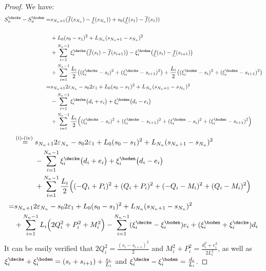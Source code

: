 \begin{thm}
\begin{proof}
We have:
\begin{align*}
S^\decke_n  - S^\boden_n =& s_{{N_n}+1} (\overline f(s_{N_n}) - \underline f(s_{N_n})) + s_0 ( \underline f(s_1) -  \overline f(s_1))\\ \\ 
&+  L_0 (s_0 - s_1)^2  + L_{N_n} (s_{{N_n}+1} - s_{N_n})^2\\
		 &+\sum_{i=1}^{{N_n}-1} \xi^\decke_{i} \bigl( \overline f(s_i) - \overline f(s_{i+1}) \bigr) - \xi^\boden_{i} \bigl( \underline f(s_i) - \underline f(s_{i+1})\bigr) \\
		&+ \sum_{i=1}^{{N_n}-1} \frac{L_i}{2} \bigl( (\xi^\decke_{i}-s_i )^2+ (\xi^\decke_{i} -s_{i+1})^2 \bigr) + \frac{L_i}{2} \bigl( (\xi^\boden_{i}-s_i )^2 + (\xi^\boden_{i} -s_{i+1})^2 \bigr) \\
		\stackrel{\text{ }}{=} 
& s_{{N_n}+1} 2 \varepsilon_{N_n} - s_0 2 \varepsilon_1 +  L_0 (s_0 - s_1)^2  + L_{N_n} (s_{{N_n}+1} - s_{N_n})^2\\
		 &-\sum_{i=1}^{{N_n}-1} \xi^\decke_{i} \bigl( d_i+ e_i \bigr) + \xi^\boden_{i} \bigl(  d_i-e_i \bigr) \\
		&+ \sum_{i=1}^{{N_n}-1} \frac{L_i}{2} \Bigl( (\xi^\decke_{i}-s_i )^2+ (\xi^\decke_{i} -s_{i+1})^2  +  (\xi^\boden_{i}-s_i )^2 + (\xi^\boden_{i} -s_{i+1})^2 \Bigr) \\
\end{align*}
%
\begin{align*}
		\stackrel{\text{(i)-(iv) }}{=} 
& s_{{N_n}+1} 2 \varepsilon_{N_n} - s_0 2 \varepsilon_1 +  L_0 (s_0 - s_1)^2  + L_{N_n} (s_{{N_n}+1} - s_{N_n})^2\\
		 &-\sum_{i=1}^{{N_n}-1} \xi^\decke_{i} \bigl( d_i+ e_i \bigr) + \xi^\boden_{i} \bigl(  d_i-e_i \bigr) \\
		&+  \sum_{i=1}^{{N_n}-1} \frac{L_i}{2} \Bigl( (-Q_i+P_i)^2+ (Q_i+P_i)^2  +  (-Q_i - M_i)^2 + (Q_i - M_i)^2 \Bigr) \\
\end{align*}
%
\begin{align*}
		\stackrel{ }{=} 
& s_{{N_n}+1} 2 \varepsilon_{N_n} - s_0 2 \varepsilon_1 +  L_0 (s_0 - s_1)^2  + L_{N_n} (s_{{N_n}+1} - s_{N_n})^2\\
		&+  \sum_{i=1}^{{N_n}-1} L_i \Bigl( 2 Q_i^2+  P_i^2  +   M_i^2 \Bigr) 
		-\sum_{i=1}^{{N_n}-1} (\xi^\decke_{i} - \xi^\boden_i ) e_i  + (\xi^\boden_{i}+ \xi^\decke_i) d_i
		\\
\end{align*}
%
It can be easily verified that $2 Q_i^2 = \frac{(s_i - s_{i+1})^2}{2}$ and $M_i^2 + P_i^2 = \frac{d_i^2 + e_i^2}{2 L_i^2}$, as well as 
$\xi^\decke_i + \xi^\boden_i = (s_i + s_{i+1}) + \frac{e_i}{L_i}$ and $\xi^\decke_i - \xi^\boden_i = \frac{d_i}{L_i}$.


\end{proof}
\end{thm}
